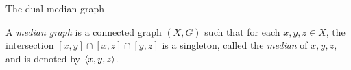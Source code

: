 \documentclass{beamer}
\begin{document}
    \begin{frame}{The dual median graph}
        \begin{definition}
            A \textit{median graph} is a connected graph $(X,G)$ such that for each $x,y,z\in X$, the intersection $[x,y]\cap[x,z]\cap[y,z]$ is a singleton, called the \textit{median} of $x,y,z$, and is denoted by $\left\langle x,y,z\right\rangle$.
        \end{definition}

        \vspace{-0.2in}

        \begin{center}
        \end{center}


\end{frame}
\end{document}
